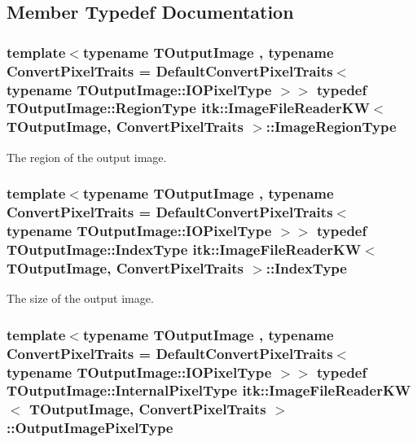 \subsection{Member Typedef Documentation}
\hypertarget{classitk_1_1_image_file_reader_k_w_aeb29601addf7afcf200728eafc93dccd}{
\subsubsection[{Image\-Region\-Type}]{\setlength{\rightskip}{0pt plus 5cm}template$<$typename T\-Output\-Image , typename Convert\-Pixel\-Traits  = Default\-Convert\-Pixel\-Traits$<$                    typename T\-Output\-Image\-::\-I\-O\-Pixel\-Type $>$$>$ typedef T\-Output\-Image\-::\-Region\-Type {\bf itk\-::\-Image\-File\-Reader\-K\-W}$<$ T\-Output\-Image, Convert\-Pixel\-Traits $>$\-::{\bf Image\-Region\-Type}}}\label{classitk_1_1_image_file_reader_k_w_aeb29601addf7afcf200728eafc93dccd}
The region of the output image. \hypertarget{classitk_1_1_image_file_reader_k_w_a9daa1ecf6fe0192e6ea86f9bf9785912}{
\subsubsection[{Index\-Type}]{\setlength{\rightskip}{0pt plus 5cm}template$<$typename T\-Output\-Image , typename Convert\-Pixel\-Traits  = Default\-Convert\-Pixel\-Traits$<$                    typename T\-Output\-Image\-::\-I\-O\-Pixel\-Type $>$$>$ typedef T\-Output\-Image\-::\-Index\-Type {\bf itk\-::\-Image\-File\-Reader\-K\-W}$<$ T\-Output\-Image, Convert\-Pixel\-Traits $>$\-::{\bf Index\-Type}}}\label{classitk_1_1_image_file_reader_k_w_a9daa1ecf6fe0192e6ea86f9bf9785912}
The size of the output image. \hypertarget{classitk_1_1_image_file_reader_k_w_a3bc68922731e94450245260bc9eced45}{
\subsubsection[{Output\-Image\-Pixel\-Type}]{\setlength{\rightskip}{0pt plus 5cm}template$<$typename T\-Output\-Image , typename Convert\-Pixel\-Traits  = Default\-Convert\-Pixel\-Traits$<$                    typename T\-Output\-Image\-::\-I\-O\-Pixel\-Type $>$$>$ typedef T\-Output\-Image\-::\-Internal\-Pixel\-Type {\bf itk\-::\-Image\-File\-Reader\-K\-W}$<$ T\-Output\-Image, Convert\-Pixel\-Traits $>$\-::{\bf Output\-Image\-Pixel\-Type}}}\label{classitk_1_1_image_file_reader_k_w_a3bc68922731e94450245260bc9eced45}
